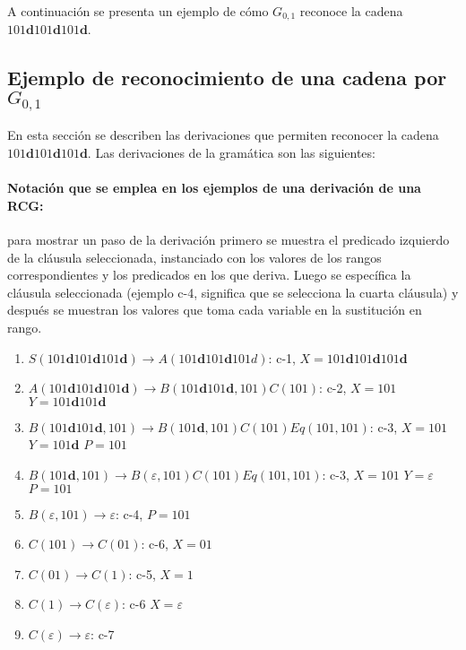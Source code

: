 \documentclass[12pt]{article}
\begin{document}
A continuación se presenta un ejemplo de cómo $G_{0,1}$ reconoce la cadena $101\mathbf{d}101\mathbf{d}101\mathbf{d}$.

\subsection{Ejemplo de reconocimiento de una cadena por $G_{0,1}$}

En esta sección se describen las derivaciones que permiten reconocer la cadena $101\mathbf{d}101\mathbf{d}101\mathbf{d}$. Las derivaciones
de la gramática son las siguientes:

\paragraph{Notación que se emplea en los ejemplos de una derivación de una RCG:} para mostrar un paso de la
derivación primero se muestra el predicado izquierdo de la cláusula seleccionada, instanciado con los valores
de los rangos correspondientes y los predicados en los que deriva. Luego se específica la cláusula seleccionada
(ejemplo c-4, significa que se selecciona la cuarta cláusula) y después se muestran los valores que toma cada
variable en la sustitución en rango.

\begin{enumerate}
    \item $S(101\mathbf{d}101\mathbf{d}101\mathbf{d}) \to A(101\mathbf{d}101\mathbf{d}101d)$: c-1, $X=101\mathbf{d}101\mathbf{d}101\mathbf{d}$
    \item $A(101\mathbf{d}101\mathbf{d}101\mathbf{d}) \to B(101\mathbf{d}101\mathbf{d},101)C(101)$: c-2, $X=101$ $Y=101\mathbf{d}101\mathbf{d}$
    \item $B(101\mathbf{d}101\mathbf{d},101) \to B(101\mathbf{d},101)C(101)Eq(101,101)$: c-3, $X=101$ $Y=101\mathbf{d}$ $P=101$
    \item $B(101\mathbf{d},101) \to B(\varepsilon,101)C(101)Eq(101,101)$: c-3, $X=101$ $Y=\varepsilon$ $P=101$
    \item $B(\varepsilon,101) \to \varepsilon$: c-4, $P=101$
    \item $C(101)\to C(01)$: c-6, $X=01$
    \item $C(01)\to C(1)$: c-5, $X=1$
    \item $C(1)\to C(\varepsilon)$: c-6 $X=\varepsilon$
    \item $C(\varepsilon)\to \varepsilon$: c-7
\end{enumerate}
\end{document}
